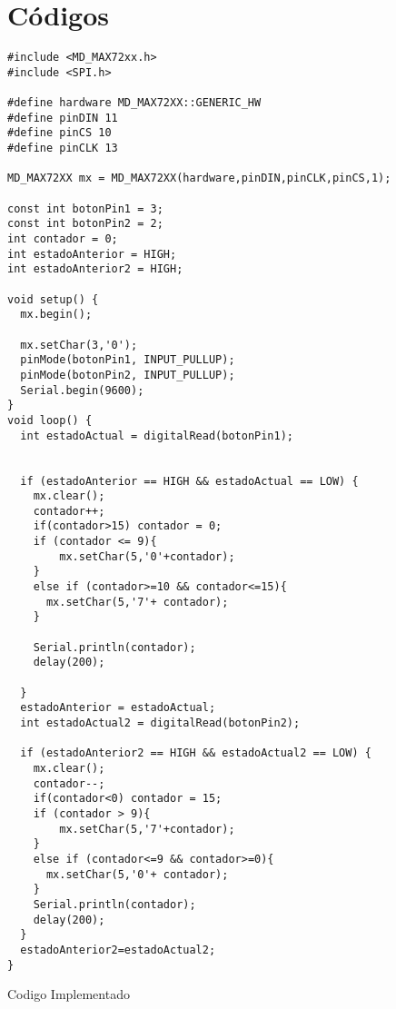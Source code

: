 \section{Códigos}

\begin{listing}[H]
  \scriptsize
  \begin{verbatim}
#include <MD_MAX72xx.h>
#include <SPI.h>

#define hardware MD_MAX72XX::GENERIC_HW
#define pinDIN 11
#define pinCS 10
#define pinCLK 13

MD_MAX72XX mx = MD_MAX72XX(hardware,pinDIN,pinCLK,pinCS,1);

const int botonPin1 = 3;  
const int botonPin2 = 2;
int contador = 0;         
int estadoAnterior = HIGH; 
int estadoAnterior2 = HIGH;

void setup() {
  mx.begin();
  
  mx.setChar(3,'0');
  pinMode(botonPin1, INPUT_PULLUP); 
  pinMode(botonPin2, INPUT_PULLUP);
  Serial.begin(9600);
}
void loop() {
  int estadoActual = digitalRead(botonPin1);
  

  if (estadoAnterior == HIGH && estadoActual == LOW) {
    mx.clear();
    contador++;
    if(contador>15) contador = 0;
    if (contador <= 9){
        mx.setChar(5,'0'+contador);
    }
    else if (contador>=10 && contador<=15){
      mx.setChar(5,'7'+ contador);
    }
    
    Serial.println(contador);
    delay(200); 
    
  }
  estadoAnterior = estadoActual; 
  int estadoActual2 = digitalRead(botonPin2);
 
  if (estadoAnterior2 == HIGH && estadoActual2 == LOW) {
    mx.clear();
    contador--;
    if(contador<0) contador = 15;
    if (contador > 9){
        mx.setChar(5,'7'+contador);
    }
    else if (contador<=9 && contador>=0){
      mx.setChar(5,'0'+ contador);
    }
    Serial.println(contador);
    delay(200); 
  }
  estadoAnterior2=estadoActual2;
}
  \end{verbatim}
  \caption{Codigo Implementado}
  \label{lst:cod-1}
\end{listing}
